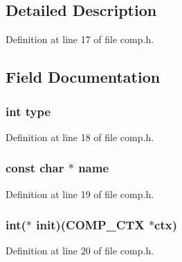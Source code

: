 \subsection{Detailed Description}


Definition at line 17 of file comp.\+h.



\subsection{Field Documentation}
\subsubsection[{\texorpdfstring{type}{type}}]{\setlength{\rightskip}{0pt plus 5cm}int type}\hypertarget{structcomp__method__st_ac765329451135abec74c45e1897abf26}{}\label{structcomp__method__st_ac765329451135abec74c45e1897abf26}


Definition at line 18 of file comp.\+h.

\subsubsection[{\texorpdfstring{name}{name}}]{\setlength{\rightskip}{0pt plus 5cm}const char $\ast$ name}\hypertarget{structcomp__method__st_afcd1706c9144e6d6eee6127661ae3be2}{}\label{structcomp__method__st_afcd1706c9144e6d6eee6127661ae3be2}


Definition at line 19 of file comp.\+h.

\subsubsection[{\texorpdfstring{init}{init}}]{\setlength{\rightskip}{0pt plus 5cm}int($\ast$ init)({\bf C\+O\+M\+P\+\_\+\+C\+TX} $\ast$ctx)}\hypertarget{structcomp__method__st_ab77de1e945c28ea8c140ec5917d3e91d}{}\label{structcomp__method__st_ab77de1e945c28ea8c140ec5917d3e91d}


Definition at line 20 of file comp.\+h.

